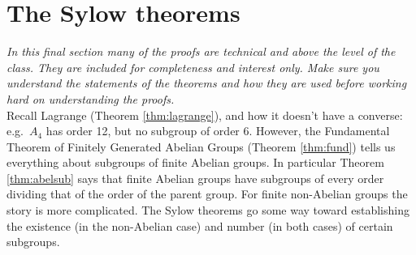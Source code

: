 \begin{exercises}{}{}
\begin{enumerate}
		
	\end{enumerate}
\end{exercises}

\clearpage

\iffalse

\section{The Sylow theorems}

\emph{In this final section many of the proofs are technical and above the level of the class. They are included for completeness and interest only. Make sure you understand the statements of the theorems and how they are used before working hard on understanding the proofs.}\\

Recall Lagrange (Theorem \ref{thm:lagrange}), and how it doesn't have a converse: e.g.~$A_4$ has order 12, but no subgroup of order 6. However, the Fundamental Theorem of Finitely Generated Abelian Groups (Theorem \ref{thm:fund}) tells us everything about subgroups of finite Abelian groups. In particular Theorem \ref{thm:abelsub} says that finite Abelian groups have subgroups of every order dividing that of the order of the parent group. For finite non-Abelian groups the story is more complicated. The Sylow theorems go some way toward establishing the existence (in the non-Abelian case) and number (in both cases) of certain subgroups.

